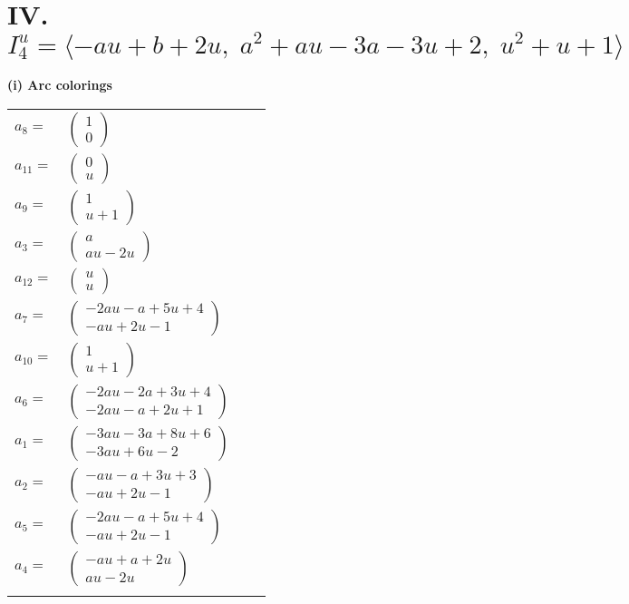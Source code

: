 \documentclass[1p]{elsarticle_modified}
\theoremstyle{definition}
\begin{document}
\centering \section*{IV. $I^u_{4}= \langle - a u+b+2 u,\;a^2+a u-3 a-3 u+2,\;u^2+u+1 \rangle$}
\flushleft \textbf{(i) Arc colorings}\\
\begin{tabular}{m{7pt} m{180pt} m{7pt} m{180pt} }
\flushright $a_{8}=$&$\begin{pmatrix}1\\0\end{pmatrix}$ \\
\flushright $a_{11}=$&$\begin{pmatrix}0\\u\end{pmatrix}$ \\
\flushright $a_{9}=$&$\begin{pmatrix}1\\u+1\end{pmatrix}$ \\
\flushright $a_{3}=$&$\begin{pmatrix}a\\a u-2 u\end{pmatrix}$ \\
\flushright $a_{12}=$&$\begin{pmatrix}u\\u\end{pmatrix}$ \\
\flushright $a_{7}=$&$\begin{pmatrix}-2 a u- a+5 u+4\\- a u+2 u-1\end{pmatrix}$ \\
\flushright $a_{10}=$&$\begin{pmatrix}1\\u+1\end{pmatrix}$ \\
\flushright $a_{6}=$&$\begin{pmatrix}-2 a u-2 a+3 u+4\\-2 a u- a+2 u+1\end{pmatrix}$ \\
\flushright $a_{1}=$&$\begin{pmatrix}-3 a u-3 a+8 u+6\\-3 a u+6 u-2\end{pmatrix}$ \\
\flushright $a_{2}=$&$\begin{pmatrix}- a u- a+3 u+3\\- a u+2 u-1\end{pmatrix}$ \\
\flushright $a_{5}=$&$\begin{pmatrix}-2 a u- a+5 u+4\\- a u+2 u-1\end{pmatrix}$ \\
\flushright $a_{4}=$&$\begin{pmatrix}- a u+a+2 u\\a u-2 u\end{pmatrix}$\\&\end{tabular}
\end{document}
